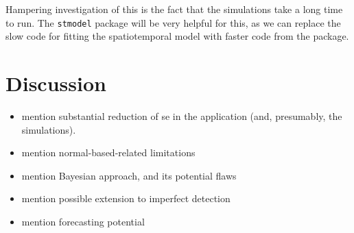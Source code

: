 \documentclass[]{interact}
\theoremstyle{plain}%
\theoremstyle{definition}
\theoremstyle{remark}
\begin{document}
Hampering investigation of this is the fact that the simulations take a
long time to run. The \texttt{stmodel} package will be very helpful for
this, as we can replace the slow code for fitting the spatiotemporal
model with faster code from the package.

\section{Discussion} \label{section:Discussion}

\begin{itemize}
\item
  mention substantial reduction of se in the application (and,
  presumably, the simulations).
\item
  mention normal-based-related limitations
\item
  mention Bayesian approach, and its potential flaws
\item
  mention possible extension to imperfect detection
\item
  mention forecasting potential
\end{itemize}



\end{document}
